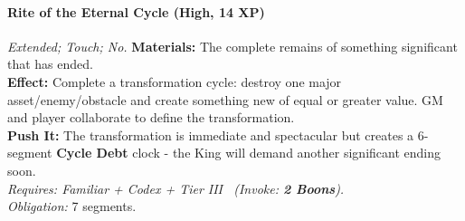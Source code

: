 \paragraph{Rite of the Eternal Cycle (High, 14 XP)} \emph{Extended; Touch; No.}
\textbf{Materials:} The complete remains of something significant that has ended. \\
\textbf{Effect:} Complete a transformation cycle: destroy one major asset/enemy/obstacle and create something new of equal or greater value. GM and player collaborate to define the transformation. \\
\textbf{Push It:} The transformation is immediate and spectacular but creates a 6-segment \textbf{Cycle Debt} clock - the King will demand another significant ending soon. \\
\emph{Requires: Familiar + Codex + Tier III \ (\textit{Invoke:} \textbf{2 Boons}).} \\
\emph{Obligation:} 7 segments.

